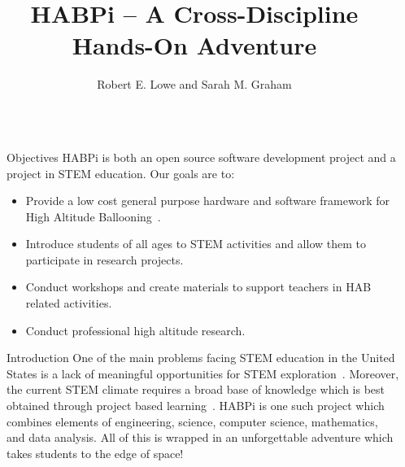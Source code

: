 \documentclass[final]{beamer}
\title{HABPi -- A Cross-Discipline Hands-On Adventure} %
\author{Robert E. Lowe and Sarah M. Graham} %
\institute{Maryville College and Pellissippi State Community College} %
\newlength{\sepwid}
\newlength{\onecolwid}
\begin{document}

\setlength{\belowcaptionskip}{2ex} %
\setlength\belowdisplayshortskip{2ex} %

\begin{frame}[t] %

\begin{columns}[t] %

\begin{column}{\sepwid}\end{column} %

\begin{column}{\onecolwid} %


\begin{alertblock}{Objectives}
HABPi is both an open source software development project and a project in STEM education.  Our goals are to:
\begin{itemize}
\item Provide a low cost general purpose hardware and software framework for High Altitude Ballooning~\cite{lowe}.
\item Introduce students of all ages to STEM activities and allow them to participate in research projects.
\item Conduct workshops and create materials to support teachers in HAB related activities.
\item Conduct professional high altitude research.
\end{itemize}
\end{alertblock}


\begin{block}{Introduction}
One of the main problems facing STEM education in the United States is a lack of meaningful opportunities for STEM exploration~\cite{dejarnette}. 
Moreover, the current STEM climate requires a broad base of knowledge which is best obtained through project based learning~\cite{kennedy}.  HABPi is one such project which combines elements of engineering, science, computer science, mathematics, and data analysis.  All of this is wrapped in an unforgettable adventure which takes students to the edge of space!


\end{block}
\end{column}
\end{columns}
\end{frame}
\end{document}
